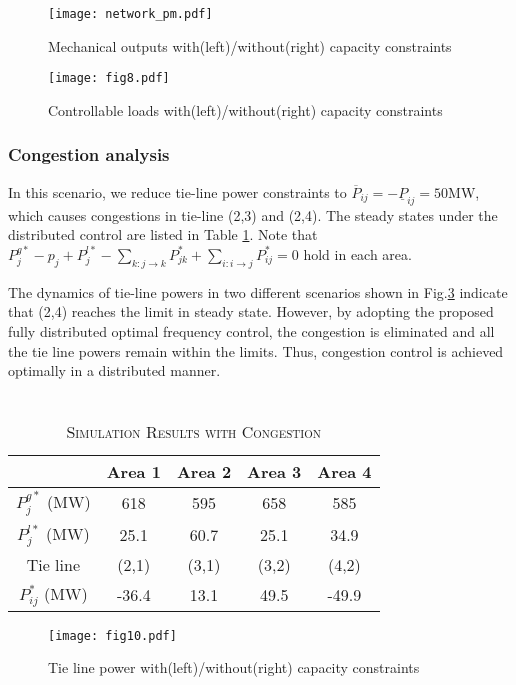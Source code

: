 \begin{figure}[htp]
	\centering
	\texttt{[image: network\_pm.pdf]}
	\caption{Mechanical outputs with(left)/without(right) capacity constraints}
	\label{fig:dynamicnet.mec}
\end{figure}


\begin{figure}[htp]
	\centering
	\texttt{[image: fig8.pdf]}
	\caption{Controllable loads with(left)/without(right) capacity constraints}
	\label{fig:dynamicnet.2}
\end{figure}

\subsubsection {Congestion analysis}
In this scenario, we reduce tie-line power constraints to $\overline{P}_{ij}=-\underline{P}_{ij}=50$MW, which causes congestions in tie-line (2,3) and  (2,4). The steady states under the distributed control are listed in Table \ref{tab:epcong}. Note that $P_j^{g*} - {p_j} + P_j^{l*} - \sum\limits_{k:j \to k} {{P_{jk}^*}}  + \sum\limits_{i:i \to j} {{P_{ij}^*}}  = 0$ hold in each area. 

The dynamics of tie-line powers in two different scenarios shown in Fig.\ref{fig:congestion} indicate that (2,4) reaches the limit in steady state. However, by adopting the proposed fully distributed optimal frequency control, the congestion is eliminated and all the tie line powers remain within the limits.  Thus, congestion control is achieved optimally in a distributed manner.

\begin{table}[htb]
	\centering
	\caption{\\ \textsc {Simulation Results with Congestion}}
	\label{tab:epcong}
	\begin{tabular}{c c c c c}
		\hline 
		& Area 1 & Area 2 & Area 3& Area 4\\
		\hline
		$P^{g*}_j$ (MW) & 618   & 595  & 658  & 585\\
		$P^{l*}_j$ (MW) & 25.1  & 60.7 & 25.1 & 34.9\\
		\hline
		\hline
		Tie line  & (2,1) & (3,1) & (3,2) & (4,2)\\
		\hline
		$P_{ij}^*$ (MW) & -36.4 & 13.1 & 49.5 & -49.9\\
		\hline
	\end{tabular}
\end{table}

\begin{figure}[htp]
	\centering
	\texttt{[image: fig10.pdf]}
	\caption{Tie line power with(left)/without(right) capacity constraints}
	\label{fig:congestion}
\end{figure}
